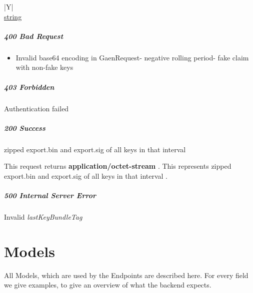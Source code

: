 \documentclass[a4paper
]{ubarticle}
\begin{document}
    
        \begin{ubresponses}{\textwidth}{|Y|}
        \\
        \hline
             \hyperref[sec:string] { string } \\
 \hline

        \end{ubresponses}
    
\subsubsection{ 400 Bad Request }
\begin{itemize}
\item Invalid base64 encoding in GaenRequest- negative rolling period- fake claim with non-fake keys
\end{itemize} 


\subsubsection{ 403 Forbidden }
Authentication failed
 


\subsubsection{ 200 Success }
zipped export.bin and export.sig of all keys in that interval
 

        
    This request returns \textbf{ application/octet-stream }. This represents zipped export.bin and export.sig of all keys in that interval
.

\subsubsection{ 500 Internal Server Error }
Invalid \emph{lastKeyBundleTag}
 



\part{Models}
All Models, which are used by the Endpoints are described here. For every field we give examples, to give an overview of what the backend expects.
\label{sec:Models}
\end{document}
